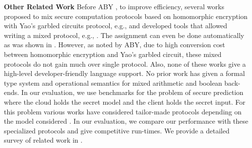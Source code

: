 \noindent\textbf{Other Related Work} 
Before ABY \cite{aby}, to improve efficiency, several works proposed
to mix secure computation protocols based on homomorphic
encryption with Yao’s garbled circuits protocol, e.g., \cite{barni,blanton,brickell,franz,huang,valeriaMatrix,valeriaRidge,schropferK11}
  and developed tools that allowed writing a mixed \mpc protocol, e.g., \cite{bogdanov,lone,tasty}. The assignment can
even be done automatically as was shown in \cite{autoS}. 
However, as noted by ABY, due to high conversion cost between homomorphic encryption and Yao's garbled circuit, these mixed protocols do not gain much over single protocol. Also, none of these works give a high-level developer-friendly language support.
No prior work has given a formal type system and operational semantics for mixed arithmetic and boolean back-ends.
In our evaluation, we use benchmarks for the problem of secure prediction where the cloud holds the secret model and the client holds the secret input. For this problem various works have considered tailor-made protocols depending on the model considered \cite{shafindss,wu,secureml,minionn}. In our evaluation, we compare our performance with these specialized protocols and give competitive run-times. We provide a detailed survey of related work in .
